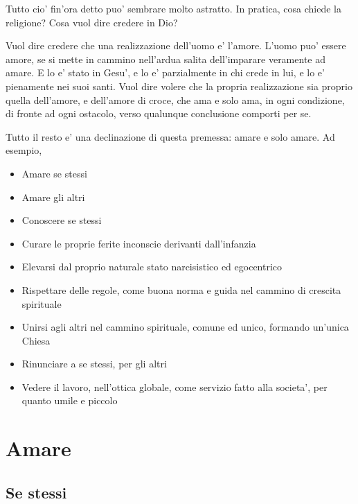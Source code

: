 Tutto cio' fin'ora detto puo' sembrare molto astratto. In pratica, cosa chiede la religione? Cosa vuol dire credere in Dio?

Vuol dire credere che una realizzazione dell'uomo e' l'amore. L'uomo puo' essere amore, se si mette in cammino nell'ardua salita dell'imparare veramente ad amare. E lo e' stato in Gesu', e lo e' parzialmente in chi crede in lui, e lo e' pienamente nei suoi santi. Vuol dire volere che la propria realizzazione sia proprio quella dell'amore, e dell'amore di croce, che ama e solo ama, in ogni condizione, di fronte ad ogni ostacolo, verso qualunque conclusione comporti per se.


Tutto il resto e' una declinazione di questa premessa: amare e solo amare. Ad esempio,
\begin{itemize}
    \item Amare se stessi
    \item Amare gli altri
    \item Conoscere se stessi
    \item Curare le proprie ferite inconscie derivanti dall'infanzia
    \item Elevarsi dal proprio naturale stato narcisistico ed egocentrico
    \item Rispettare delle regole, come buona norma e guida nel cammino di crescita spirituale
    \item Unirsi agli altri nel cammino spirituale, comune ed unico, formando un'unica Chiesa
    \item Rinunciare a se stessi, per gli altri
    \item Vedere il lavoro, nell'ottica globale, come servizio fatto alla societa', per quanto umile e piccolo
\end{itemize}




\section{Amare}
\label{amareSe}


\subsection{Se stessi}

